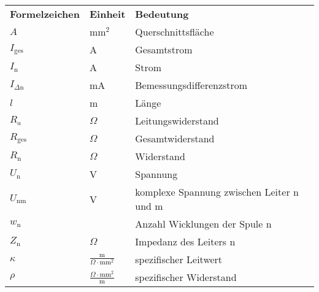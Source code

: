 \begin{table}[hbt]	
	\renewcommand{\arraystretch}{2}
	\begin{tabular}{p{4cm}p{3cm}l}
		\textbf{Formelzeichen} & \textbf{Einheit} & \textbf{Bedeutung}\\
	
        $A$ & mm$^2$ & Querschnittsfläche\\
		$I_{\text{ges}}$ & A & Gesamtstrom \\
        $I_\text{n}$ & A & Strom \\
        $I_{\Delta\text{n}}$ & mA & Bemessungsdifferenzstrom\\
        $l$ & m & Länge\\
        $R_a$ & $\Omega$ & Leitungswiderstand\\
		$R_{\text{ges}}$ & $\Omega$ & Gesamtwiderstand \\
        $R_\text{n}$ & $\Omega$ & Widerstand \\
        $U_\text{n}$ & V & Spannung \\
        $U_\text{nm}$ & V & komplexe Spannung zwischen Leiter n und m\\
        $w_\text{n}$ & & Anzahl Wicklungen der Spule n\\
        $Z_\text{n}$ & $\Omega$ & Impedanz des Leiters n\\

        $\kappa$ & $\frac{\text{m}}{\Omega \cdot \text{mm}^2}$ & spezifischer Leitwert\\
        $\rho$ & $\frac{\Omega \cdot \text{mm}^2}{\text{m}}$ & spezifischer Widerstand\\
        
	\end{tabular} 
\end{table}
